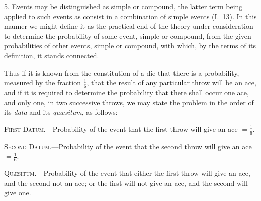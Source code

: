 \documentclass[oneside]{book}
\begin{document}
5. Events may be distinguished as simple or compound, the
latter term being applied to such events as consist in a combination
of simple events (I.~13). In this manner we might define it
as the practical end of the theory under consideration to determine
the probability of some event, simple or compound, from
the given probabilities of other events, simple or compound,
with which, by the terms of its definition, it stands connected.

Thus if it is known from the constitution of a die that there
is a probability, measured by the fraction $\displaystyle\frac{1}{6}$, that the result of
any particular throw will be an ace, and if it is required to determine
the probability that there shall occur one ace, and only one,
in two successive throws, we may state the problem in the order
of its \textit{data} and its \textit{qu\ae{}situm}, as follows:

\textsc{First Datum}.---Probability of the event that the first throw
will give an ace $\displaystyle =\frac{1}{6}$.

\textsc{Second Datum}.---Probability of the event that the second
throw will give an ace $\displaystyle =\frac{1}{6}$.

\textsc{Qu\ae{}situm}.---Probability of the event that either the first
throw will give an ace, and the second not an ace; or the first
will not give an ace, and the second will give one.
\end{document}
